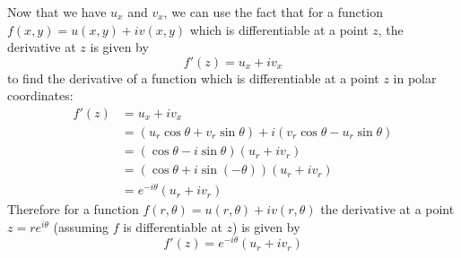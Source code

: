 \documentclass{scrartcl}
\begin{document}
Now that we have $u_x$ and $v_x$, we can use the fact that for a function $f(x,y) = u(x,y) + iv(x,y)$ which is differentiable at a point $z$, the derivative at $z$ is given by $$f'(z) = u_x + iv_x$$ to find the derivative of a function which is differentiable at a point $z$ in polar coordinates:
\begin{align*}
  f'(z) &= u_x + iv_x\\
  &= \left(u_r\cos\theta + v_r\sin\theta\right) + i\left(v_r\cos\theta - u_r\sin\theta\right)\\
  &= (\cos\theta - i\sin\theta)(u_r + iv_r)\\
  &= \left(\cos\theta + i\sin(-\theta)\right)(u_r + iv_r)\\
  &= e^{-i\theta}(u_r + iv_r)
\end{align*}
Therefore for a function $f(r,\theta) = u(r,\theta) + iv(r,\theta)$ the derivative at a point $z=re^{i\theta}$ (assuming $f$ is differentiable at $z$) is given by
$$ f'(z) = e^{-i\theta}(u_r + iv_r)$$
\end{document}
